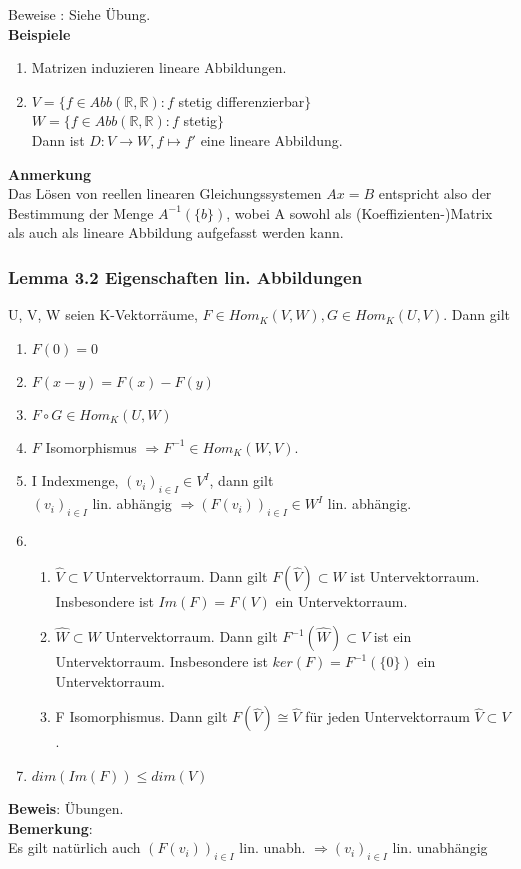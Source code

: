 \documentclass{scrartcl}
\newcommand{\R}{\mathbb{R}}
\begin{document}
Beweise : Siehe \"Ubung.\\
\textbf{Beispiele}
\begin{enumerate}
\item{Matrizen induzieren lineare Abbildungen.}
\item{\(V = \{f \in Abb(\R, \R) : f\) stetig differenzierbar\(\}\)\\
\(W = \{f \in Abb(\R, \R) : f\) stetig\(\}\)\\
Dann ist \(D : V \to W, f \mapsto f'\) eine lineare Abbildung.}
\end{enumerate}
\textbf{Anmerkung}\\
Das L\"osen von reellen linearen Gleichungssystemen \(Ax = B\) entspricht also der Bestimmung der Menge \(A^{-1}(\{b\})\), wobei A sowohl als (Koeffizienten-)Matrix als auch als lineare Abbildung aufgefasst werden kann.

\subsubsection{Lemma 3.2 Eigenschaften lin. Abbildungen}
U, V, W seien K-Vektorr\"aume, \(F \in Hom_K(V,W), G \in Hom_K(U, V)\). Dann gilt
\begin{enumerate}
\item{\(F(0) = 0\)}
\item{\(F(x - y) = F(x) - F(y)\)}
\item{\(F \circ G \in Hom_K(U, W)\)}
\item{\(F\) Isomorphismus \(\Rightarrow F^{-1} \in Hom_K(W, V)\).}
\item{I Indexmenge, \((v_i)_{i \in I} \in V^I\), dann gilt\\
\((v_i)_{i \in I}\) lin. abh\"angig \(\Rightarrow (F(v_i))_{i \in I} \in W^I\) lin. abh\"angig.}
\item{
\begin{enumerate}
\item{\(\hat{V} \subset V\) Untervektorraum. Dann gilt \(F(\hat{V}) \subset W\) ist Untervektorraum. Insbesondere ist \(Im(F) = F(V)\) ein Untervektorraum.}
\item{\(\hat{W} \subset W\) Untervektorraum. Dann gilt \(F^{-1}(\hat{W}) \subset V\) ist ein Untervektorraum. Insbesondere ist \(ker(F) = F^{-1}(\{0\})\) ein Untervektorraum.}
\item{F Isomorphismus. Dann gilt \(F(\hat{V}) \cong \hat{V}\) f\"ur jeden Untervektorraum \(\hat{V} \subset V\).}
\end{enumerate}
}
\item{\(dim(Im(F)) \le dim(V)\)}
\end{enumerate}
\textbf{Beweis}: \"Ubungen.\\
\textbf{Bemerkung}:\\
Es gilt nat\"urlich auch \((F (v_i))_{i \in I}\) lin. unabh. \(\Rightarrow (v_i)_{i \in I}\) lin. unabh\"angig
\end{document}

